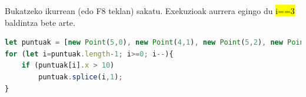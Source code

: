 Bukatzeko \faPlay {} ikurrean (edo F8 teklan) sakatu. Exekuzioak aurrera egingo du \hl{i==3} baldintza bete arte.

\begin{lstlisting}[language=JavaScript]
let puntuak = [new Point(5,0), new Point(4,1), new Point(5,2), new Point(6,0), new Point(11,1), new Point(15,2)];
for (let i=puntuak.length-1; i>=0; i--){
    if (puntuak[i].x > 10)
        puntuak.splice(i,1);
}
\end{lstlisting}